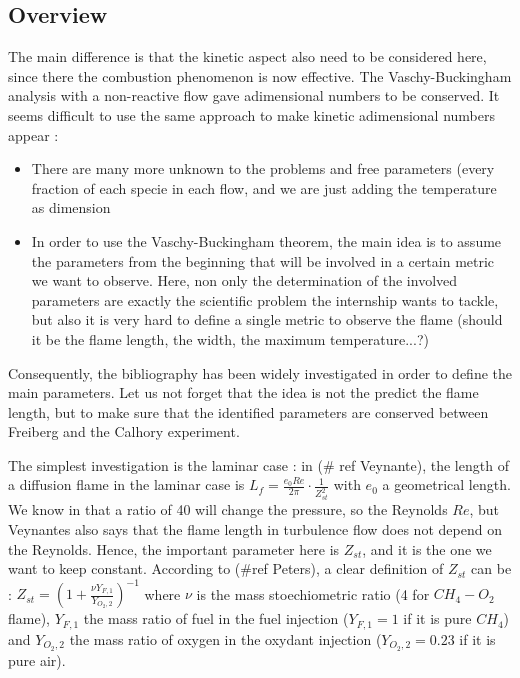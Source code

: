 \subsection{Overview}

The main difference is that the kinetic aspect also need to be considered here, since there the combustion phenomenon is now effective. The Vaschy-Buckingham analysis with a non-reactive flow  gave adimensional numbers to be conserved. It seems difficult to use the same approach to make kinetic adimensional numbers appear :

\begin{itemize}
\item There are many more unknown to the problems and free parameters (every fraction of each specie in each flow, and we are just adding the temperature as dimension
\item In order to use the Vaschy-Buckingham theorem, the main idea is to assume the parameters from the beginning that will be involved in a certain metric we want to observe. Here, non only the determination of the  involved parameters are exactly the scientific problem the internship wants to tackle, but also it is very hard to define a single metric to observe the flame (should it be the flame length, the width, the maximum temperature...?)
\end{itemize}
Consequently, the bibliography has been widely investigated in order to define the main parameters. Let us not forget that the idea is not the predict the flame length, but to make sure that the identified parameters are conserved between Freiberg and the Calhory experiment.

The simplest investigation is the laminar case : in (\# ref Veynante), the length of a diffusion flame in the laminar case is $L_{f}=\frac{e_{0}Re}{2\pi}\cdot \frac{1}{Z_{st}^2}$  with $e_{0}$ a geometrical length. We know in that a ratio of 40 will change the pressure, so the Reynolds $Re$, but Veynantes also says that the flame length in turbulence flow does not depend on the Reynolds. Hence, the important parameter here is $Z_{st}$, and it is the one we want to keep constant. According to (\#ref Peters), a clear definition of $Z_{st}$ can be : $Z_{st}=(1+\frac{\nu Y_{F,1}}{Y_{O_{2},2}})^{-1}$ where $\nu$ is the mass stoechiometric ratio (4 for $CH_{4}-O_{2}$ flame),    $Y_{F,1}$ the mass ratio of fuel in the fuel injection ($Y_{F,1}=1$ if it is pure $CH_{4}$) and $Y_{O_{2},2}$ the mass ratio of oxygen in the oxydant injection ($Y_{O_{2},2}=0.23$ if it is pure air).

